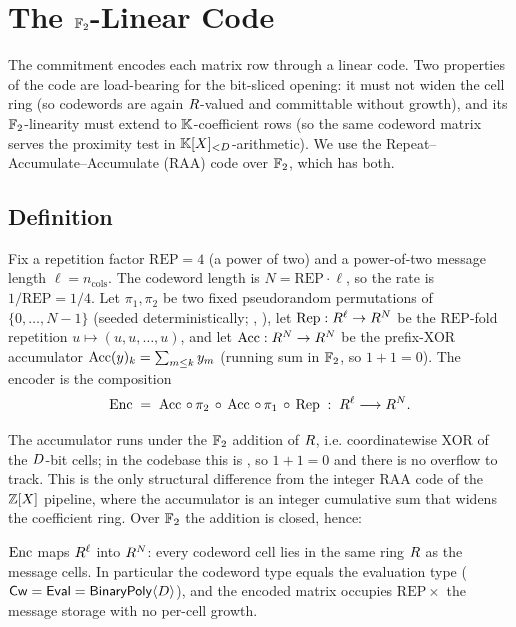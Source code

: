 \section{The $\mathbb{F}_2$-Linear Code}
\label{sec:code}

The commitment encodes each matrix row through a linear code. Two
properties of the code are load-bearing for the bit-sliced opening: it
must not widen the cell ring (so codewords are again $R$-valued
and committable without growth), and its $\mathbb{F}_2$-linearity must extend
to $\mathbb{K}$-coefficient rows (so the same codeword matrix serves the
proximity test in $\mathbb{K}[X]_{<D}$-arithmetic). We use the
Repeat--Accumulate--Accumulate (RAA) code over $\mathbb{F}_2$, which has both.

\subsection{Definition}

\begin{definition}
\label{def:raa}
Fix a repetition factor $\mathrm{REP} = 4$ (a power of two) and a power-of-two
message length $\ell = n_{\mathrm{cols}}$. The codeword length is
$N = \mathrm{REP}\cdot\ell$, so the rate is $1/\mathrm{REP} = 1/4$. Let
$\pi_1, \pi_2$ be two fixed pseudorandom permutations of $\{0,\dots,N-1\}$
(seeded deterministically; , ),
let $\operatorname{Rep} : R^{\ell} \to R^{N}$ be the $\mathrm{REP}$-fold
repetition $u \mapsto (u, u, \dots, u)$, and let
$\operatorname{Acc} : R^{N} \to R^{N}$ be the prefix-XOR accumulator
$\operatorname{Acc}(y)_k = \sum_{m \le k} y_m$ (running sum in $\mathbb{F}_2$, so
$1 + 1 = 0$). The encoder is the composition
\[
  \operatorname{Enc} \;=\; \operatorname{Acc} \,\circ\, \pi_2 \,\circ\, \operatorname{Acc} \,\circ\, \pi_1 \,\circ\, \operatorname{Rep}
  \;:\; R^{\ell} \longrightarrow R^{N}.
\]
\end{definition}

The accumulator runs under the $\mathbb{F}_2$ addition of $R$, i.e.
coordinatewise XOR of the $D$-bit cells; in the codebase this is
, so $1 + 1 = 0$ and there is no overflow to track.
This is the only structural difference from the integer RAA code of the
$\mathbb{Z}[X]$ pipeline, where the accumulator is an integer cumulative sum that
widens the coefficient ring. Over $\mathbb{F}_2$ the addition is closed, hence:

\begin{lemma}
\label{lem:no-widen}
$\operatorname{Enc}$ maps $R^{\ell}$ into $R^{N}$: every codeword cell
lies in the same ring $R$ as the message cells. In particular the
codeword type equals the evaluation type ($\mathsf{Cw} = \mathsf{Eval} =
\mathsf{BinaryPoly}\langle D\rangle$), and the encoded matrix occupies
$\mathrm{REP}\times$ the message storage with no per-cell growth.
\end{lemma}

